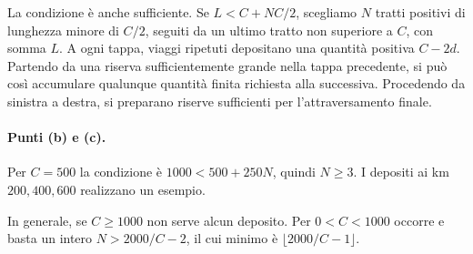 {La condizione è anche sufficiente. Se $L<C+NC/2$, scegliamo $N$ tratti positivi di lunghezza minore di $C/2$, seguiti da un ultimo tratto non superiore a $C$, con somma $L$. A ogni tappa, viaggi ripetuti depositano una quantità positiva $C-2d$. Partendo da una riserva sufficientemente grande nella tappa precedente, si può così accumulare qualunque quantità finita richiesta alla successiva. Procedendo da sinistra a destra, si preparano riserve sufficienti per l'attraversamento finale.

\paragraph{Punti (b) e (c).}
Per $C=500$ la condizione è $1000<500+250N$, quindi $N\geq3$. I depositi ai km $200,400,600$ realizzano un esempio.

In generale, se $C\geq1000$ non serve alcun deposito. Per $0<C<1000$ occorre e basta un intero $N>2000/C-2$, il cui minimo è $\lfloor2000/C-1\rfloor$.
}
